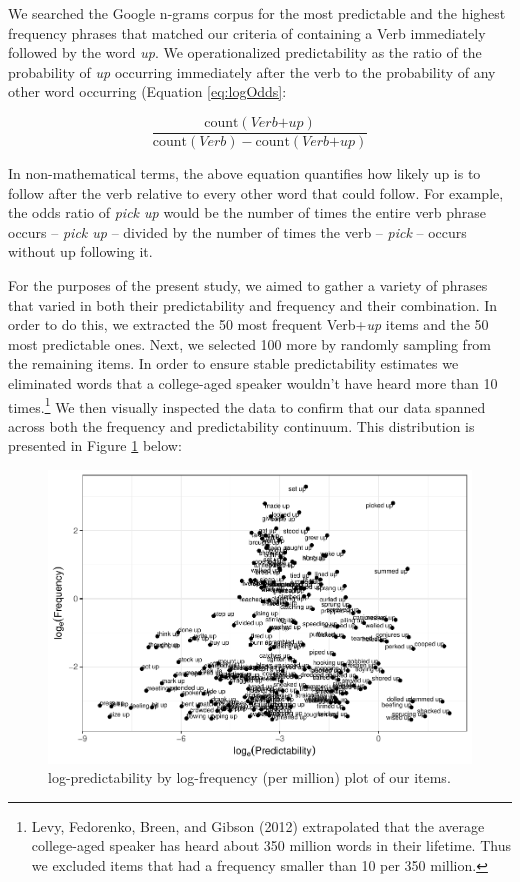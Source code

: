 \documentclass[
  man,floatsintext]{apa6}
\begin{document}
We searched the Google n-grams corpus for the most predictable and the highest frequency phrases that matched our criteria of containing a Verb immediately followed by the word \emph{up}. We operationalized predictability as the ratio of the probability of \emph{up} occurring immediately after the verb to the probability of any other word occurring (Equation \eqref{eq:logOdds}:

\begin{equation}
\label{eq:logOdds}
\frac{\mathrm{count(\textit{Verb+up})}}{\mathrm{count(\textit{Verb})} - \mathrm{count(\textit{Verb+up})}} 
\end{equation}

In non-mathematical terms, the above equation quantifies how likely up is to follow after the verb relative to every other word that could follow. For example, the odds ratio of \emph{pick up} would be the number of times the entire verb phrase occurs -- \emph{pick up} -- divided by the number of times the verb -- \emph{pick} -- occurs without up following it.

For the purposes of the present study, we aimed to gather a variety of phrases that varied in both their predictability and frequency and their combination. In order to do this, we extracted the 50 most frequent Verb+\emph{up} items and the 50 most predictable ones. Next, we selected 100 more by randomly sampling from the remaining items. In order to ensure stable predictability estimates we eliminated words that a college-aged speaker wouldn't have heard more than 10 times.\footnote{Levy, Fedorenko, Breen, and Gibson (2012) extrapolated that the average college-aged speaker has heard about 350 million words in their lifetime. Thus we excluded items that had a frequency smaller than 10 per 350 million.} We then visually inspected the data to confirm that our data spanned across both the frequency and predictability continuum. This distribution is presented in Figure \ref{fig:stimplot2} below:

\begin{figure}

{\centering \includegraphics[width=0.8\linewidth]{write-up_files/figure-latex/stimplot2-1} 

}

\caption{log-predictability by log-frequency (per million) plot of our items.}\label{fig:stimplot2}
\end{figure}
\end{document}
